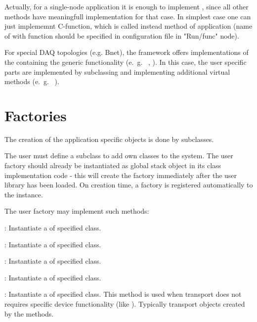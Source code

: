 Actually, for a single-node application it is enough to implement ,
since all other methods have meaningfull implementation for that case. 
In simplest case one can just implememnt C-function, which is called instead 
method of application (name of with function should be specified in configuration file
in "Run/func" node).

For special DAQ topologies (e.g. Bnet), the framework offers 
implementations of the  containing the 
generic functionality (e.~g.~ , ). 
In this case, the user specific parts are implemented by subclassing 
and implementing additional virtual methods (e.~g.~ ).    



\section{Factories}
\label{prog_plugin_factory}

The creation of the application specific objects is done by  subclasses.

The user must define a  
subclass to add own classes to the system.
The user factory should already be instantiated as global stack object
in its class implementation code -
this will create  the factory immediately after the user library has been loaded. 
On creation time, a factory is registered automatically to the  
instance.

The user factory may implement such methods:
\bdes
	\item [\func{CreateModule()}] : 
	Instantiate a  of specified class. 
	
\item [\func{CreateDevice()}] : 
	Instantiate a  of specified class. 

\item [\func{CreateThread()}] : 
   Instantiate a  of specified class.
	
\item [\func{CreateApplication()}] : 
	Instantiate a  of specified class.

\item [\func{CreateTransport()}] : 
   Instantiate a  of specified class.
   This method is used when transport does not requires specific device functionality
   (like ). Typically transport objects
   created by the  methods.   
	
